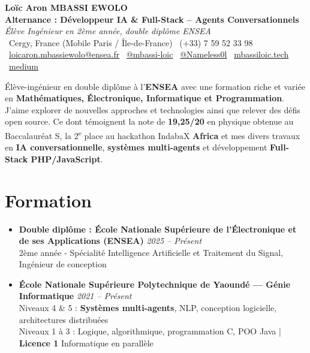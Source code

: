 \documentclass[a4paper,11pt]{article}
\begin{document}
\begin{center}
    {\Large \textbf{Loïc Aron MBASSI EWOLO}} \\ \vspace{4pt}
    \textbf{\large Alternance : Développeur IA \& Full-Stack – Agents Conversationnels} \\
    \textit{\small Élève Ingénieur en 2ème année, double diplôme ENSEA} \\ \vspace{4pt}
    \small
    \faMapMarker\ Cergy, France (Mobile Paris / Île-de-France) \quad
    \faPhone\ (+33) 7 59 52 33 98 \\ \vspace{2pt}
    \faEnvelope\ \href{mailto:loicaron.mbassiewolo@ensea.fr}{loicaron.mbassiewolo@ensea.fr} \quad
    \faLinkedin\ \href{https://www.linkedin.com/in/mbassi-loic-3942a9246/}{@mbassi-loic} \quad
    \faGithub\ \href{https://github.com/Nameless0l}{@Nameless0l} \quad
    \faGlobe\ \href{https://mbassiloic.tech}{mbassiloic.tech} \quad
    \faMedium\ \href{https://medium.com/@wwwmbassiloic}{medium}
\end{center}

\vspace{-8pt}

\noindent\small{Élève-ingénieur en double diplôme à l'\textbf{ENSEA} avec une formation riche et variée en \textbf{Mathématiques, Électronique, Informatique et Programmation}. 
J'aime explorer de nouvelles approches et technologies ainsi que relever des défis open source. 
Ce dont témoignent la note de \textbf{19,25/20} en physique obtenue au Baccalauréat S, la 2\textsuperscript{e} place au hackathon IndabaX \textbf{Africa} et mes divers travaux en \textbf{IA conversationnelle}, \textbf{systèmes multi-agents} et développement \textbf{Full-Stack PHP/JavaScript}.}

\vspace{4pt}

\section{Formation}
\begin{itemize}[leftmargin=*, label={.}, nosep]
    \item \textbf{Double diplôme : École Nationale Supérieure de l'Électronique et de ses Applications (ENSEA)} \hfill \textit{2025 -- Présent} \\
    \small{2ème année - Spécialité Intelligence Artificielle et Traitement du Signal, Ingénieur de conception}
    \vspace{2pt}
    \item \textbf{École Nationale Supérieure Polytechnique de Yaoundé — Génie Informatique} \hfill \textit{2021 -- Présent} \\
    \small{Niveaux 4 \& 5 : \textbf{Systèmes multi-agents}, NLP, conception logicielle, architectures distribuées} \\
    \small{Niveaux 1 à 3 : Logique, algorithmique, programmation C, POO Java | \textbf{Licence 1} Informatique en parallèle}
\end{itemize}
\end{document}

